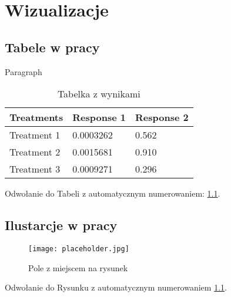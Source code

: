 \chapter{Wizualizacje}

\section{Tabele w pracy}


Paragraph
\begin{table}[h]
\centering
\caption{Tabelka z wynikami} %
\begin{tabular}{l l l}
\toprule
\textbf{Treatments} & \textbf{Response 1} & \textbf{Response 2}\\
\midrule
Treatment 1 & 0.0003262 & 0.562 \\
Treatment 2 & 0.0015681 & 0.910 \\
Treatment 3 & 0.0009271 & 0.296 \\
\bottomrule
\end{tabular}
\label{tab:example} %
\end{table}

Odwołanie do Tabeli z automatycznym numerowaniem: \ref{tab:example}.


\section{Ilustarcje w pracy}

\begin{figure}[h]
\centering\texttt{[image: placeholder.jpg]}
\caption{Pole z miejscem na rysunek}
\label{fig:placeholder} %
\end{figure}

Odwołanie do Rysunku z automatycznym numerowaniem \ref{fig:placeholder}.

\lipsum[1-7] %